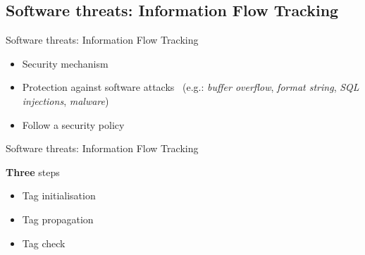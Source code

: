 \subsection{Software threats: Information Flow Tracking}
\begin{frame}{Software threats: Information Flow Tracking}
        \begin{block}{}
            \begin{itemize}
                [square]
                \justifying
                \item Security mechanism
                \item Protection against software attacks~\cite{HAK-21-acmcsur} (e.g.: \textit{buffer overflow}, \textit{format string}, \textit{SQL injections}, \textit{malware})
                \item Follow a security policy
            \end{itemize}
        \end{block}
\end{frame}

\begin{frame}{Software threats: Information Flow Tracking}
    \begin{minipage}[c]{0.35\linewidth}
        \begingroup
        \begin{block}{\textbf{Three} steps}
            \begin{itemize}
                \item<1-> Tag initialisation
                \item<2-> Tag propagation
                \item<3-> Tag check
            \end{itemize}
        \end{block}
        \endgroup
    \end{minipage}\hfill%
    \begin{minipage}[c]{0.6\linewidth}
        \begin{figure}
            \centering
            \label{fig:schemaDIFT}
        \end{figure}
    \end{minipage}
\end{frame}

